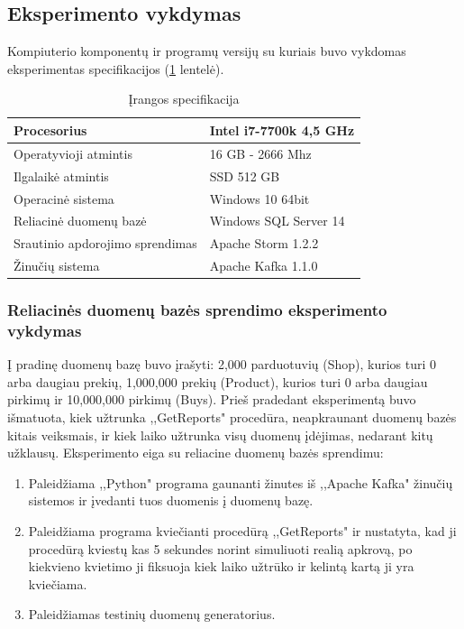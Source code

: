 \documentclass{VUMIFPSkursinis}
\begin{document}
\subsection{Eksperimento vykdymas}
Kompiuterio komponentų ir programų versijų su kuriais buvo vykdomas eksperimentas specifikacijos (\ref{table:hardware} lentelė).
\begin{table}[!htbp]
    \begin{center}
        \caption{Įrangos specifikacija}
        \label{table:hardware}
        \begin{tabular}{ | l | l |  } 
            \hline
            Procesorius & Intel i7-7700k 4,5 GHz \\* \hline
            Operatyvioji atmintis & 16 GB - 2666 Mhz \\* \hline
            Ilgalaikė atmintis & SSD 512 GB \\* \hline
            Operacinė sistema & Windows 10 64bit \\* \hline
            Reliacinė duomenų bazė & Windows SQL Server 14 \\* \hline
            Srautinio apdorojimo sprendimas & Apache Storm 1.2.2 \\* \hline
            Žinučių sistema & Apache Kafka 1.1.0 \\* \hline
        \end{tabular}
    \end{center}
\end{table}\par

\subsubsection{Reliacinės duomenų bazės sprendimo eksperimento vykdymas}
Į pradinę duomenų bazę buvo įrašyti: 2,000 parduotuvių (Shop), kurios turi 0 arba daugiau prekių, 1,000,000 prekių (Product), kurios turi 0 arba daugiau pirkimų ir 10,000,000 pirkimų (Buys).
Prieš pradedant eksperimentą buvo išmatuota, kiek užtrunka ,,GetReports" procedūra, neapkraunant duomenų bazės kitais veiksmais, ir kiek laiko užtrunka visų duomenų įdėjimas,
nedarant kitų užklausų. 
Eksperimento eiga su reliacine duomenų bazės sprendimu:
\begin{enumerate} 
\item Paleidžiama ,,Python" programa gaunanti žinutes iš ,,Apache Kafka" žinučių sistemos ir įvedanti tuos duomenis į duomenų bazę. 
\item Paleidžiama programa kviečianti procedūrą ,,GetReports" ir nustatyta, kad ji procedūrą kviestų kas 5 sekundes norint simuliuoti realią apkrovą,
po kiekvieno kvietimo ji fiksuoja kiek laiko užtrūko ir kelintą kartą ji yra kviečiama. 
\item Paleidžiamas testinių duomenų generatorius.
\end{enumerate}
\end{document}
